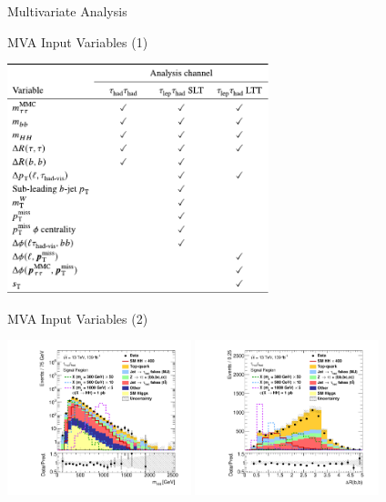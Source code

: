 \documentclass[11pt, xcolor={dvipsnames}, aspectratio=169, notes]{beamer}
\begin{document}

\begin{frame}[standout]
  Multivariate Analysis
\end{frame}


\begin{frame}{MVA Input Variables (1)}
  \centering

  \includegraphics[width=0.57\textwidth]{mva_input_table}
\end{frame}


\begin{frame}{MVA Input Variables (2)}
  \centering

  \includegraphics[width=0.4\textwidth]{mva/prefit/Region_BMin0_incJet1_distmHH_J2_Y2015_DLLOS_T2_SpcTauHH_L0_Prefit_logy}%
  \includegraphics[width=0.4\textwidth]{mva/prefit/Region_BMin0_incJet1_distdRBB_J2_Y2015_DLLOS_T2_SpcTauHH_L0_Prefit_fontembed}
\end{frame}
\end{document}
